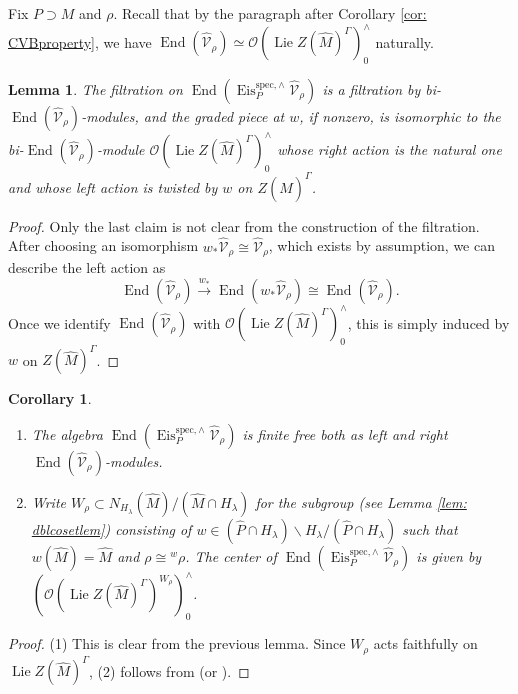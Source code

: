 \documentclass{amsart}
\newtheorem{lemma}[theorem]{Lemma}
\newtheorem{corollary}[theorem]{Corollary}
\theoremstyle{definition}
\theoremstyle{remark}
\numberwithin{equation}{section}
\DeclareMathOperator{\Lie}{Lie}
\newcommand{\mc}{\mathcal}
\newcommand{\spec}{\mathrm{spec}}
\DeclareMathOperator{\End}{End}
\newcommand{\wh}{\widehat}
\DeclareMathOperator{\Eis}{\mathrm{Eis}}
\begin{document}
Fix $P\supset M$ and $\rho$. Recall that by the paragraph after Corollary \ref{cor: CVBproperty}, we have $\End (\widehat{\mc V}_\rho)\simeq \mc O (\Lie Z(\wh M)^\Gamma)^\wedge_0$ naturally. 

\begin{lemma}
The filtration on $\End(\Eis^{\spec,\wedge}_{P}\wh{\mc V}_{\rho})$ is a filtration by bi-$\End (\wh{\mc V}_{\rho})$-modules, and the graded piece at $w$, if nonzero, is isomorphic to the bi-$\End (\wh{\mc V}_{\rho})$-module $\mc O (\Lie Z(\wh M)^\Gamma)^\wedge_0$ whose right action is the natural one and whose left action is twisted by $w$ on $Z(\wh M)^\Gamma$. 
\end{lemma}

\begin{proof}
Only the last claim is not clear from the construction of the filtration. 
After choosing an isomorphism $w_*\widehat{\mc V}_\rho\cong \wh{\mc V}_\rho$, which exists by assumption, we can describe the left action as
\[
\End (\wh{\mc V}_{\rho})\xrightarrow{w_*} \End (w_*\wh{\mc V}_{\rho}) \cong \End (\widehat{\mc V}_\rho). 
\]
Once we identify $\End (\wh{\mc V}_{\rho})$ with $\mc O (\Lie Z(\wh M)^\Gamma)^\wedge_0$, this is simply induced by $w$ on $Z(\wh M)^\Gamma$.  
\end{proof}

\begin{corollary}{\label{cor: EndEisfinitefree}}

\begin{enumerate}
    \item The algebra $\End(\Eis^{\spec, \wedge}_P \wh{\mc V}_\rho)$ is finite free both as left and right $\End(\wh{\mc V}_\rho)$-modules. 
    \item Write $W_{\rho}\subset N_{H_\lambda}(\wh M)/(\wh M \cap H_\lambda) $ for the subgroup (see Lemma \ref{lem: dblcosetlem}) consisting of $w\in (\wh P \cap H_\lambda)\backslash H_\lambda / (\wh P \cap H_\lambda)$ such that $w(\wh M)=\wh M$ and $\rho\cong {}^w \rho$. 
    The center of $\End(\Eis^{\spec, \wedge}_P \wh{\mc V}_\rho)$ is given by $(\mc O(\Lie Z(\wh M)^\Gamma)^{W_{\rho}})^\wedge_0$. 
\end{enumerate}
\end{corollary}

\begin{proof}
(1) This is clear from the previous lemma. Since $W_\rho$ acts faithfully on $\Lie Z(\wh M)^{\Gamma}$, (2) follows from \cite[Lemma 36]{BernsteinRumelhart} (or \cite[Lemma in p.205]{Renard}). 
\end{proof}
\end{document}
